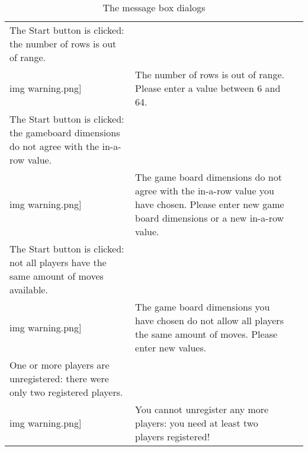 \begin{table}[H]
\begin{longtable}{|p{}
                    |p{}
                    |p{}|}
    The Start button is clicked: the number of rows is out of range. &
    \texttt{[image: \\img warning.png]}       &
    The number of rows is out of range. Please enter a value between
    6 and 64.                                                        \\\hline

    The Start button is clicked: the gameboard dimensions do not
    agree with the in-a-row value.                                 &
    \texttt{[image: \\img warning.png]}     &
    The game board dimensions do not agree with the in-a-row value
    you have chosen. Please enter new game board dimensions or a
    new in-a-row value.                                            \\\hline

    The Start button is clicked: not all players have the same amount
    of moves available.                                                &
    \texttt{[image: \\img warning.png]}         &
    The game board dimensions you have chosen do not allow all players
    the same amount of moves. Please enter new values.                 \\\hline

    One or more players are unregistered: there were only two
    registered players.                                        &
    \texttt{[image: \\img warning.png]} &
    You cannot unregister any more players: you need at least
    two players registered!                                    \\\hline

  \end{longtable}
  \caption{The  message box dialogs}
  \label{tab:MessageDialogs}
\end{table}

